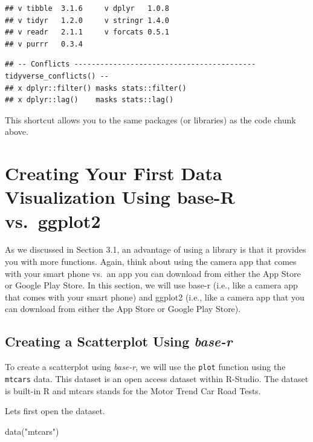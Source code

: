 \documentclass[
]{book}
\newenvironment{Shaded}{\begin{snugshade}}{\end{snugshade}}
\newcommand{\FunctionTok}[1]{\textcolor[rgb]{0.00,0.00,0.00}{#1}}
\newcommand{\NormalTok}[1]{#1}
\newcommand{\StringTok}[1]{\textcolor[rgb]{0.31,0.60,0.02}{#1}}
\begin{document}
\begin{verbatim}
## v tibble  3.1.6     v dplyr   1.0.8
## v tidyr   1.2.0     v stringr 1.4.0
## v readr   2.1.1     v forcats 0.5.1
## v purrr   0.3.4
\end{verbatim}

\begin{verbatim}
## -- Conflicts ------------------------------------------ tidyverse_conflicts() --
## x dplyr::filter() masks stats::filter()
## x dplyr::lag()    masks stats::lag()
\end{verbatim}

This shortcut allows you to the same packages (or libraries) as the code chunk above.

\hypertarget{creating-your-first-data-visualization-using-base-r-vs.-ggplot2}{%
\section{Creating Your First Data Visualization Using base-R vs.~ggplot2}\label{creating-your-first-data-visualization-using-base-r-vs.-ggplot2}}

As we discussed in Section 3.1, an advantage of using a library is that it provides you with more functions. Again, think about using the camera app that comes with your smart phone vs.~an app you can download from either the App Store or Google Play Store. In this section, we will use base-r (i.e., like a camera app that comes with your smart phone) and ggplot2 (i.e., like a camera app that you can download from either the App Store or Google Play Store).

\hypertarget{creating-a-scatterplot-using-base-r}{%
\subsection{\texorpdfstring{Creating a Scatterplot Using \emph{base-r}}{Creating a Scatterplot Using base-r}}\label{creating-a-scatterplot-using-base-r}}

To create a scatterplot using \emph{base-r}, we will use the \texttt{plot} function using the \texttt{mtcars} data. This dataset is an open access dataset within R-Studio. The dataset is built-in R and mtcars stands for the Motor Trend Car Road Tests.

Lets first open the dataset.

\begin{Shaded}
\begin{Highlighting}[]
\FunctionTok{data}\NormalTok{(}\StringTok{"mtcars"}\NormalTok{)}
\end{Highlighting}
\end{Shaded}
\end{document}

